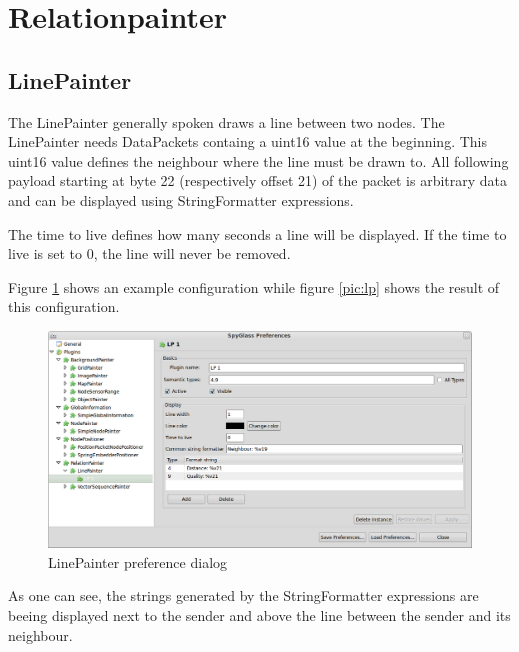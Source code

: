 \section{Relationpainter}

\subsection{LinePainter}

The LinePainter generally spoken draws a line between two nodes. The LinePainter needs DataPackets containg a uint16 value
at the beginning. This uint16 value defines the neighbour where the line must be drawn to. All following payload starting
at byte 22 (respectively offset 21) of the packet is arbitrary data and can be displayed using
StringFormatter expressions.

The time to live defines how many seconds a line will be displayed. If the time to live is set to 0, the line will
never be removed.

Figure \ref{pic:lp_preferences} shows an example configuration while figure \ref{pic:lp} shows the result of this
configuration.

\begin{figure}[htb]
  \begin{center}
    \includegraphics[width=13.2cm]{./pics/linepainter_prefpage}
    \caption{LinePainter preference dialog}
    \label{pic:lp_preferences}
  \end{center}
\end{figure}

As one can see, the strings generated by the StringFormatter expressions are beeing displayed next to the
sender and above the line between the sender and its neighbour.

